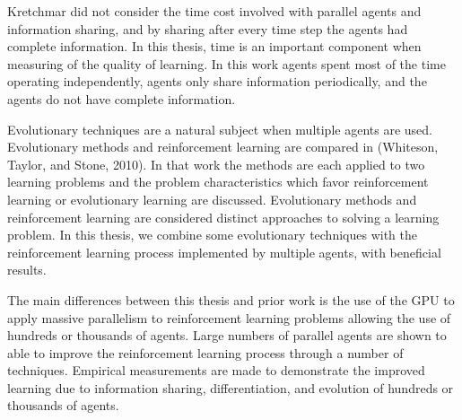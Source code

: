 Kretchmar did not consider the time cost involved with parallel agents and information sharing, and by sharing after every time step the agents had complete information.  In this thesis, time is an important component when measuring of the quality of learning. In this work agents spent most of the time operating independently, agents only share information periodically, and the agents do not have complete information. 

Evolutionary techniques are a natural subject when multiple agents are used.  Evolutionary methods and reinforcement learning are compared in (Whiteson, Taylor, and Stone, 2010).  In that work the methods are each applied to two learning problems and the problem characteristics which favor reinforcement learning or evolutionary learning are discussed.  Evolutionary methods and reinforcement learning are considered distinct approaches to solving a learning problem.  In this thesis, we combine some evolutionary techniques with the reinforcement learning process implemented by multiple agents, with beneficial results.

The main differences between this thesis and prior work is the use of the GPU to apply massive parallelism to reinforcement learning problems allowing the use of hundreds or thousands of agents. Large numbers of parallel agents are shown to able to improve the reinforcement learning process through a number of techniques.  Empirical measurements are made to demonstrate the improved learning due to information sharing, differentiation, and evolution of hundreds or thousands of agents.
